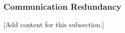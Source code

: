 
\subsubsection{Communication Redundancy}
\label{subsubsec:design_5_7_communication_redundancy}

[Add content for this subsection.]
